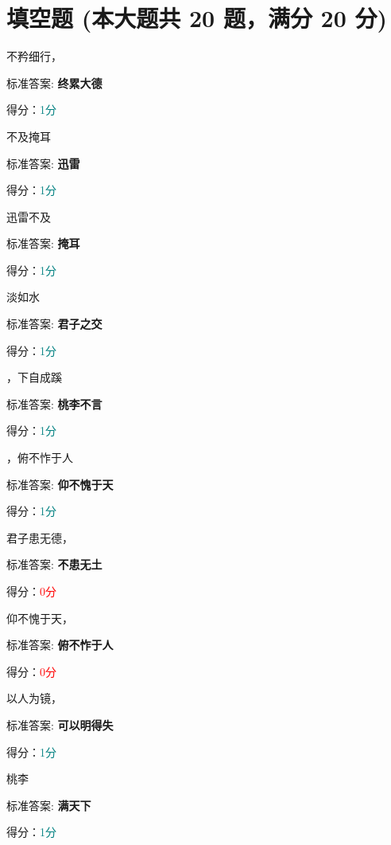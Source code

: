 \documentclass[12pt, a4paper, addpoints, answers]{exam}
\begin{document}
\section{\normalsize{填空题 (本大题共 20 题，满分 20 分)}}
\hspace{1.5cm}
\begin{multicols}{2}
\begin{questions}
\question[1] 不矜细行，\fillin[终累大德] 

标准答案: \textbf{终累大德}   

得分：\textcolor{teal}{1分} 

\question[1] \fillin[迅雷] 不及掩耳

标准答案: \textbf{迅雷}   

得分：\textcolor{teal}{1分} 

\question[1] 迅雷不及\fillin[掩耳] 

标准答案: \textbf{掩耳}   

得分：\textcolor{teal}{1分} 

\question[1] \fillin[君子之交] 淡如水

标准答案: \textbf{君子之交}   

得分：\textcolor{teal}{1分} 

\question[1] \fillin[桃李不言] ，下自成蹊

标准答案: \textbf{桃李不言}   

得分：\textcolor{teal}{1分} 

\question[1] \fillin[仰不愧于天] ，俯不怍于人

标准答案: \textbf{仰不愧于天}   

得分：\textcolor{teal}{1分} 

\question[1] 君子患无德，\fillin[不患无士] 

标准答案: \textbf{不患无土}   

得分：\textcolor{red}{0分} 

\question[1] 仰不愧于天，\fillin[俯不愧于人] 

标准答案: \textbf{俯不怍于人}   

得分：\textcolor{red}{0分} 

\question[1] 以人为镜，\fillin[可以明得失] 

标准答案: \textbf{可以明得失}   

得分：\textcolor{teal}{1分} 

\question[1] 桃李\fillin[满天下] 

标准答案: \textbf{满天下}   

得分：\textcolor{teal}{1分} 


\end{questions}
\end{multicols}
\end{document}
